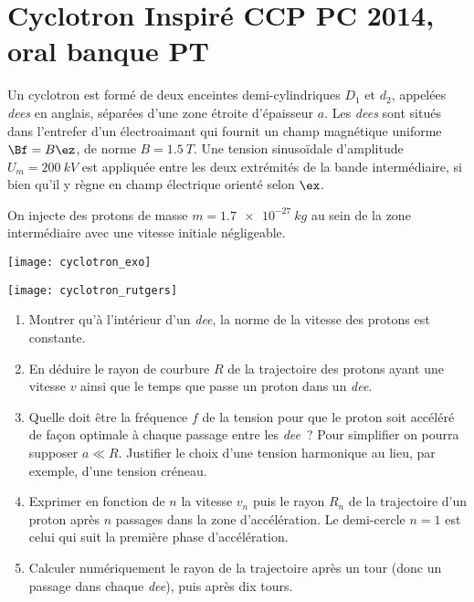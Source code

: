 \documentclass[a4paper, 12pt, final, garamond]{book}
\begin{document}
\section{Cyclotron \hfill {\small Inspiré CCP PC 2014, oral banque PT}}
Un cyclotron est formé de deux enceintes demi-cylindriques $D_1$ et $d_2$,
appelées \textit{dees} en anglais, séparées d'une zone étroite d'épaisseur $a$.
Les \textit{dees} sont situés dans l'entrefer d'un électroaimant qui fournit un
champ magnétique uniforme $\Bf = B\ez$, de norme $B = \SI{1.5}{T}$. Une tension
sinusoïdale d'amplitude $U_m = \SI{200}{kV}$ est appliquée entre les deux
extrémités de la bande intermédiaire, si bien qu'il y règne en champ électrique
orienté selon $\ex$. \bigbreak

On injecte des protons de masse $m = \SI{1.7e-27}{kg}$ au sein de la zone
intermédiaire avec une vitesse initiale négligeable. \bigbreak

\begin{minipage}{0.45\linewidth}
    \begin{center}
        \texttt{[image: cyclotron\_exo]}
        \label{fig:cyclo_exo}
    \end{center}
\end{minipage}
\hfill
\begin{minipage}{0.45\linewidth}
    \begin{center}
        \texttt{[image: cyclotron\_rutgers]}
        \label{fig:rutgers}
    \end{center}
\end{minipage} \bigbreak

\begin{enumerate}
    \item Montrer qu'à l'intérieur d'un \textit{dee}, la norme de la vitesse des
        protons est constante.
    \item En déduire le rayon de courbure $R$ de la trajectoire des protons
        ayant une vitesse $v$ ainsi que le temps que passe un proton dans un
        \textit{dee}.
    \item Quelle doit être la fréquence $f$ de la tension pour que le proton
        soit accéléré de façon optimale à chaque passage entre les \textit{dee}~?
        Pour simplifier on pourra supposer $a \ll R$. Justifier le choix d'une
        tension harmonique au lieu, par exemple, d'une tension créneau.
    \item Exprimer en fonction de $n$ la vitesse $v_n$ puis le rayon $R_n$ de la
        trajectoire d'un proton après $n$ passages dans la zone d'accélération.
        Le demi-cercle $n=1$ est celui qui suit la première phase
        d'accélération.
    \item Calculer numériquement le rayon de la trajectoire après un tour (donc un
        passage dans chaque \textit{dee}), puis après dix tours.
\end{enumerate} \bigbreak
\end{document}
